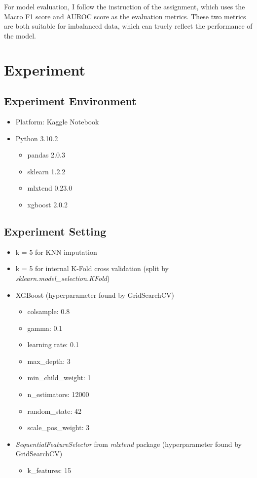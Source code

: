 \documentclass[a4paper, oneside, final, 12pt]{scrartcl} %
\begin{document}
For model evaluation, I follow the instruction of the assignment, which uses the Macro F1 score and AUROC score
as the evaluation metrics. These two metrics are both suitable for imbalanced data,
which can truely reflect the performance of the model.

\section{Experiment}

\subsection{Experiment Environment}

\begin{itemize}
  \item Platform: Kaggle Notebook
  \item Python 3.10.2
  \begin{itemize}
    \item pandas 2.0.3
    \item sklearn 1.2.2
    \item mlxtend 0.23.0
    \item xgboost 2.0.2
  \end{itemize}
\end{itemize}

\subsection{Experiment Setting}

\begin{itemize}
  \item k = 5 for KNN imputation
  \item k = 5 for internal K-Fold cross validation (split by \emph{sklearn.model\_selection.KFold})
  \item XGBoost (hyperparameter found by GridSearchCV)
  \begin{itemize}
    \item colsample: 0.8
    \item gamma: 0.1
    \item learning rate: 0.1
    \item max\_depth: 3
    \item min\_child\_weight: 1
    \item n\_estimators: 12000
    \item random\_state: 42
    \item scale\_pos\_weight: 3
  \end{itemize}
  \item \emph{SequentialFeatureSelector} from \emph{mlxtend} package (hyperparameter found by GridSearchCV)
  \begin{itemize}
    \item k\_features: 15
  \end{itemize}
\end{itemize}
\end{document}
